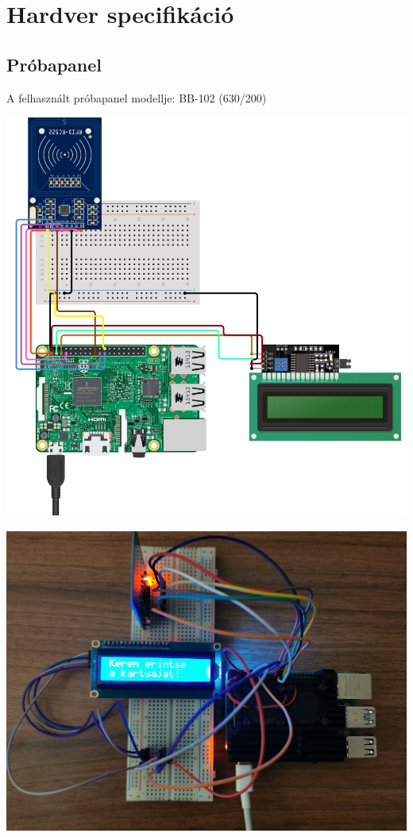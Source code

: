\documentclass[11pt, a4paper]{article}
\begin{document}
	\section{Hardver specifikáció}
		\subsection{Próbapanel}
			\begin{flushleft}
				\justifying
				A felhasznált próbapanel modellje: BB-102 (630/200)
			\end{flushleft}
			\begin{minipage}{\linewidth}
				\centering
				\includegraphics[width=1.0\linewidth]{img/breadboard_diagram}
				\label{fig:1breadboarddiagram}
			\end{minipage}
			\begin{minipage}{\linewidth}
				\centering
				\includegraphics[width=0.7\linewidth]{img/3_futas}
				\label{fig:3futas}
			\end{minipage}
			
\end{document}
